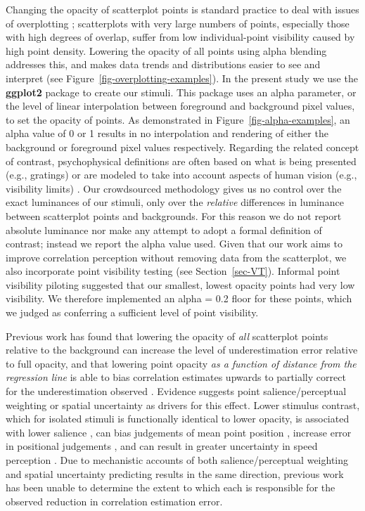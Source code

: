 \documentclass[manuscript, review, anonymous, screen]{acmart}
\begin{document}
Changing the opacity of scatterplot points is standard practice to deal
with issues of overplotting \citep{matejka_2015}; scatterplots with very
large numbers of points, especially those with high degrees of overlap,
suffer from low individual-point visibility caused by high point
density. Lowering the opacity of all points using alpha blending
\citep{few_2008} addresses this, and makes data trends and distributions
easier to see and interpret (see
Figure~\ref{fig-overplotting-examples}). In the present study we use the
\textbf{ggplot2} package \citep{hadley_gg2016} to create our stimuli.
This package uses an alpha parameter, or the level of linear
interpolation \citep{stone_2008} between foreground and background pixel
values, to set the opacity of points. As demonstrated in
Figure~\ref{fig-alpha-examples}, an alpha value of 0 or 1 results in no
interpolation and rendering of either the background or foreground pixel
values respectively. Regarding the related concept of contrast,
psychophysical definitions are often based on what is being presented
(e.g., gratings) or are modeled to take into account aspects of human
vision (e.g., visibility limits) \citep{zuffi_2007}. Our crowdsourced
methodology gives us no control over the exact luminances of our
stimuli, only over the \emph{relative} differences in luminance between
scatterplot points and backgrounds. For this reason we do not report
absolute luminance nor make any attempt to adopt a formal definition of
contrast; instead we report the alpha value used. Given that our work
aims to improve correlation perception without removing data from the
scatterplot, we also incorporate point visibility testing (see
Section~\ref{sec-VT}). Informal point visibility piloting suggested that
our smallest, lowest opacity points had very low visibility. We
therefore implemented an alpha = 0.2 floor for these points, which we
judged as conferring a sufficient level of point visibility.

Previous work has found that lowering the opacity of \emph{all}
scatterplot points relative to the background can increase the level of
underestimation error relative to full opacity, and that lowering point
opacity \emph{as a function of distance from the regression line} is
able to bias correlation estimates upwards to partially correct for the
underestimation observed \citep{strain_2023}. Evidence suggests point
salience/perceptual weighting or spatial uncertainty as drivers for this
effect. Lower stimulus contrast, which for isolated stimuli is
functionally identical to lower opacity, is associated with lower
salience \citep{healey_2011}, can bias judgements of mean point position
\citep{hong_2021}, increase error in positional judgements
\citep{wehrhahn_1990}, and can result in greater uncertainty in speed
perception \citep{champion_2017}. Due to mechanistic accounts of both
salience/perceptual weighting and spatial uncertainty predicting results
in the same direction, previous work \citep{strain_2023} has been unable
to determine the extent to which each is responsible for the observed
reduction in correlation estimation error.
\end{document}
